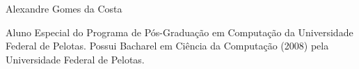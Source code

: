\documentclass[12pt,a4paper,compsoc]{IEEEtran}
\begin{document}
\begin{IEEEbiography}{Alexandre Gomes da Costa}

  Aluno Especial do Programa de Pós-Graduação em Computação da Universidade Federal de Pelotas. Possui
  Bacharel em Ciência da Computação (2008) pela Universidade Federal de Pelotas.
  
\end{IEEEbiography}
\end{document}
